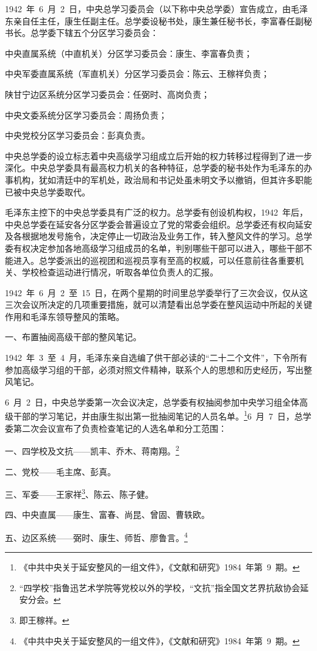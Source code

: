 1942~年~6~月~2~日，中央总学习委员会（以下称中央总学委）宣告成立，由毛泽东亲自任主任，康生任副主任。总学委设秘书处，康生兼任秘书长，李富春任副秘书长。总学委下辖五个分区学习委员会：

中央直属系统（中直机关）分区学习委员会：康生、李富春负责；

中央军委直属系统（军直机关）分区学习委员会：陈云、王稼祥负责；

陕甘宁边区系统分区学习委员会：任弼时、高岗负责；

中央文委系统分区学习委员会：周扬负责；

中央党校分区学习委员会：彭真负责。

中央总学委的设立标志着中央高级学习组成立后开始的权力转移过程得到了进一步深化。中央总学委具有最高权力机关的各种特征，总学委的秘书处作为毛泽东的办事机构，犹如清廷中的军机处，政治局和书记处虽未明文予以撤销，但其许多职能已被中央总学委取代。

毛泽东主控下的中央总学委具有广泛的权力。总学委有创设机构权，1942~年后，中央总学委在延安各分区学委会普遍设立了党的常委会组织。总学委还有权向延安及各根据地发号施令，决定停止一切政治及业务工作，转入整风文件的学习。总学委有权决定参加各地高级学习组成员的名单，判别哪些干部可以进入，哪些干部不能进入。总学委派出的巡视团和巡视员享有至高的权威，可以任意前往各重要机关、学校检查运动进行情况，听取各单位负责人的汇报。

1942~年~6~月~2~至~15~日，在两个星期的时间里总学委举行了三次会议，仅从这三次会议所决定的几项重要措施，就可以清楚看出总学委在整风运动中所起的关键作用和毛泽东领导整风的策略。

一、布置抽阅高级干部的整风笔记。

1942~年~3~至~4~月，毛泽东亲自选编了供干部必读的“二十二个文件”，下令所有参加高级学习组的干部，必须对照文件精神，联系个人的思想和历史经历，写出整风笔记。

6~月~2~日，中央总学委第一次会议决定，总学委有权抽阅参加中央学习组全体高级干部的学习笔记，并由康生拟出第一批抽阅笔记的人员名单。\footnote{《中共中央关于延安整风的一组文件》，《文献和研究》1984~年第~9~期。}6~月~7~日，总学委第二次会议宣布了负责检查笔记的人选名单和分工范围：

\begin{quoting}
一、四学校及文抗——凯丰、乔木、蒋南翔。\footnote{“四学校”指鲁迅艺术学院等党校以外的学校，“文抗”指全国文艺界抗敌协会延安分会。}

二、党校——毛主席、彭真。

三、军委——王家祥\footnote{即王稼祥。}、陈云、陈子健。

四、中央直属——康生、富春、尚昆、曾固、曹轶欧。

五、边区系统——弼时、康生、师哲、廖鲁言。\footnote{《中共中央关于延安整风的一组文件》，《文献和研究》1984~年第~9~期。}
\end{quoting}

